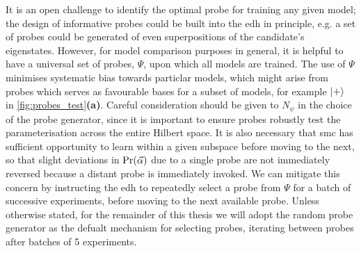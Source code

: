 It is an open challenge to identify the optimal \gls{probe} for training any given model;
    the design of informative probes could be built into the \gls{edh} in principle,
    e.g. a set of \glspl{probe} could be generated of even superpositions of the candidate's eigenstates.
However, for model comparison purposes in general, 
    it is helpful to have a universal set of probes, $\Psi$, upon which all models are trained. 
The use of $\Psi$ minimises systematic bias towards particlar models, 
    which might arise from probes which serves as favourable bases for a subset of models, 
    for example $\ket{+}$ in \cref{fig:probes_test}\textbf{(a)}. 
Careful consideration should be given to $N_{\psi}$ in the choice of the \gls{probe} generator, 
    since it is important to ensure probes robustly test the parameterisation across the entire Hilbert space.
It is also necessary that \gls{smc} has sufficient opportunity to learn within a given subspace before moving to the next, 
    so that slight deviations in $\Pr(\vec{\alpha})$ due to a single probe are not immediately reversed because a distant probe is immediately invoked. 
We can mitigate this concern by instructing the \gls{edh} to repeatedly select a \gls{probe} from $\Psi$ for a batch of successive \glspl{experiment}, 
    before moving to the next available probe. 
Unless otherwise stated, for the remainder of this thesis we will adopt the random \gls{probe} 
    generator as the defualt mechanism for selecting probes,
    iterating between probes after batches of 5 \glspl{experiment}.
